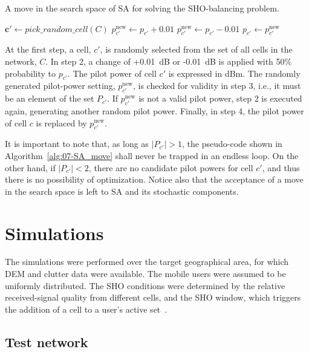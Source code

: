 \begin{algorithm}
\centering

\caption{A move in the search space of SA for solving the SHO-balancing problem.\label{alg:07-SA_move}}


\begin{algorithmic}
\State $\mathbf{c'} \gets pick\_random\_cell(C)$
\Repeat
		\State $p_{c'}^{\mathrm{new}} \gets p_{c'}+0.01$
	\Else
		\State $p_{c'}^{\mathrm{new}} \gets p_{c'}-0.01$
	\EndIf
{}
\State $p_{c'} \gets p_{c'}^{\mathrm{new}}$
\end{algorithmic}
\end{algorithm}


At the first step, a cell, $c'$, is randomly selected from the set
of all cells in the network, $C$. In step 2, a change of +0.01~dB
or -0.01~dB is applied with 50\% probability to $p_{c'}$. The pilot
power of cell $c'$ is expressed in dBm. The randomly generated pilot-power
setting, $p_{c'}^{\mathrm{new}}$, is checked for validity in step
3, i.e., it must be an element of the set $P_{c'}$. If $p_{c'}^{\mathrm{new}}$
is not a valid pilot power, step 2 is executed again, generating another
random pilot power. Finally, in step 4, the pilot power of cell $c$
is replaced by $p_{c'}^{\mathrm{new}}$.

It is important to note that, as long as $|P_{c'}|>1$, the pseudo-code
shown in Algorithm~\ref{alg:07-SA_move} shall never be trapped in
an endless loop. On the other hand, if $|P_{c'}|<2$, there are no
candidate pilot powers for cell $c'$, and thus there is no possibility
of optimization. Notice also that the acceptance of a move in the
search space is left to SA and its stochastic components.


\section{Simulations \label{sec:07-Simulations}}

The simulations were performed over the target geographical area,
for which DEM and clutter data were available. The mobile users were
assumed to be uniformly distributed. The SHO conditions were determined
by the relative received-signal quality from different cells, and
the SHO window, which triggers the addition of a cell to a user's
active set~\cite{WCDMAforUMTS_RadioAccessForThirdGenerationMobileCommunications}.


\subsection{Test network}

